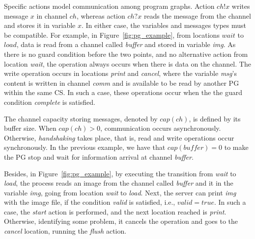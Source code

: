 Specific actions model communication among program graphs. Action $ch!x$ writes message $x$ in channel $ch$, whereas action $ch?x$ reads the message from the channel and stores it in variable $x$. In either case, the variables and messages types must be compatible. For example, in Figure~\ref{fig:pg_example}, from locations $wait$ to $load$, data is read from a channel called \textit{buffer} and stored in variable \textit{img}. As there is no guard condition before the two points, and no alternative action from location \textit{wait}, the operation always occurs when there is data on the channel.  The write operation occurs in locations \textit{print} and \textit{cancel}, where the variable \textit{msg}'s content is written in channel \textit{comm} and is available to be read by another PG within the same CS. In such a case, these operations occur when the the guard condition  \textit{complete} is satisfied.

The channel capacity  storing messages, denoted by $cap(ch)$,  is defined by its buffer size. When $cap(ch) > 0$, communication occurs asynchronously. Otherwise, \emph{handshaking} takes place, that is,  read and write operations occur synchronously. In the previous example, we have that $\mathit{cap(buffer)=0}$  to make the PG stop and wait for information arrival at channel \textit{buffer}. 

Besides, in Figure~\ref{fig:pg_example},  by executing the transition from \textit{wait} to \textit{load}, the process reads an image from the channel called \textit{buffer} and  it in the variable \textit{img}, going from location \textit{wait} to \textit{load}. Next, the server can print \textit{img} with the image file, if the condition \textit{valid} is satisfied, i.e., $valid=true$. In such a case, the \textit{start} action is performed, and the next location reached is \textit{print}. Otherwise, identifying some problem, it cancels the operation and goes to the \textit{cancel} location, running the \textit{flush} action.

%


